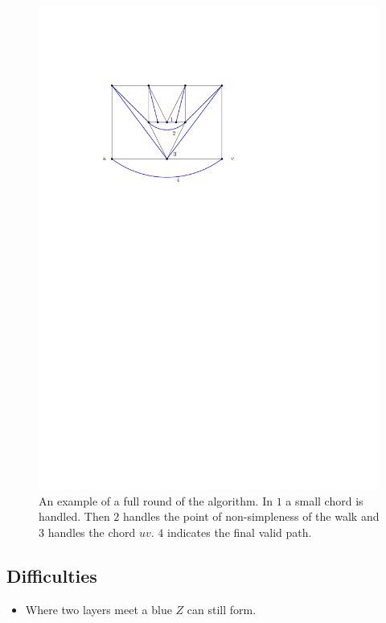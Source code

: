 \documentclass[a4paper]{article}
\theoremstyle{definition}
\begin{document}
\begin{figure}[h!]
\centering
\includegraphics[scale=1]{img/algoExample}

\caption{An example of a full round of the algorithm. In $1$ a small chord is handled. Then $2$ handles the point of non-simpleness of the walk and $3$ handles the chord $uv$. $4$ indicates the final valid path.
    \label{fig:algoEx}}
\end{figure}

\subsection{Difficulties}

\begin{itemize}
\item Where two layers meet a blue $Z$ can still form.
\end{itemize}
\end{document}
